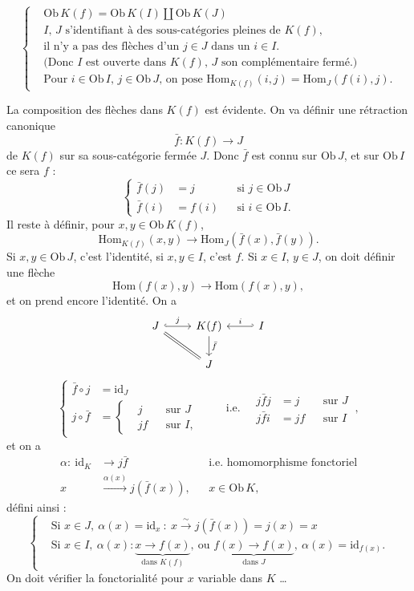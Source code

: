 \documentclass[11pt]{article}
\newcommand{\printedpage}[1]{\marginpar{\footnotesize p.~#1}}
\newcommand{\msp}[1]{\marginpar{\footnotesize [#1]}}
\newcommand{\Hom}{\mathrm{Hom}}
\newcommand{\Ob}{\mathrm{Ob}\,}
\newcommand{\id}{\mathrm{id}}
\begin{document}
\[
\left\{
\begin{aligned}
&\Ob K(f) = \Ob K(I) \amalg \Ob K(J) \qquad \\
&\text{$I$, $J$ s'identifiant à des sous-catégories pleines de $K(f)$,}\\
&\text{il n'y a pas des flèches d'un $j \in J$ dans un $i \in I$.}\\
&\text{(Donc $I$ est ouverte dans $K(f)$, $J$ son complémentaire fermé.)}\\
&\text{Pour $i \in \Ob I$, $j \in \Ob J$, on pose $\Hom_{K(f)}(i,j) = \Hom_J(f(i),j)$.}
\end{aligned}
\right.
\]

La composition des flèches dans $K(f)$ est évidente. On va définir une rétraction canonique
\[ \bar{f} : K(f) \longrightarrow J \]
de $K(f)$ sur sa sous-catégorie fermée $J$. Donc $\bar{f}$ est connu sur $\Ob J$, et sur $\Ob I$ ce sera $f$ :
\[
\left\{
\begin{aligned}
\bar{f}(j) &= j && \text{si } j \in \Ob J\\
\bar{f}(i) &= f(i) && \text{si } i \in \Ob I.
\end{aligned}
\right.
\]
Il reste à définir, pour $x, y \in \Ob K(f)$,
\msp{page 80}
\[ \Hom_{K(f)}(x,y) \longrightarrow \Hom_J(\bar{f}(x), \bar{f}(y)). \]
Si $x, y \in \Ob J$, c'est l'identité, si $x, y \in I$, c'est $f$. Si $x \in I$, $y \in J$, on doit définir une flèche
\[ \Hom(f(x),y) \longrightarrow \Hom(f(x),y), \]
et on prend encore l'identité. On a
\[
\begin{tikzcd}
J \arrow[r, hook, "j"] \arrow[dr, equal] & K(f) \arrow[d, "\bar{f}"] & I \arrow[l, hook', "i"'] \\
& J &
\end{tikzcd}
\]
\[
\left\{
\begin{aligned}
\bar{f} \circ j &= \id_J\\
j \circ \bar{f} &= \left\{
\begin{aligned}
&j && \text{sur } J\\
&jf && \text{sur } I,
\end{aligned}
\right.
\end{aligned}
\right.
\qquad \text{i.e.} \quad
\boxed{
\begin{aligned}
j\bar{f}j &= j && \text{sur } J\\
j\bar{f}i &= jf && \text{sur } I
\end{aligned}
}\ ,
\]
et on a 
\[
\begin{aligned}
\alpha :\ \id_K &\longrightarrow j\bar{f} && \text{i.e. homomorphisme fonctoriel}\\
x &\xrightarrow{\alpha(x)} j(\bar{f}(x)), && x \in \Ob K,
\end{aligned}
\]
\printedpage{6}
défini ainsi :
\[
\left\{
\begin{aligned}
&\text{Si } x \in J,\ \alpha(x) = \id_x\ :\ x \xrightarrow{\sim} j(\bar{f}(x)) = j(x) = x\\
&\text{Si } x \in I,\ \alpha(x) : \underbrace{x \longrightarrow f(x)}_{\text{dans } K(f)},\ \text{ou } \underbrace{f(x) \longrightarrow f(x)}_{\text{dans } J},\ \alpha(x) = \id_{f(x)}.
\end{aligned}
\right.
\]
On doit vérifier la fonctorialité pour $x$ variable dans $K$ \dots
\end{document}
